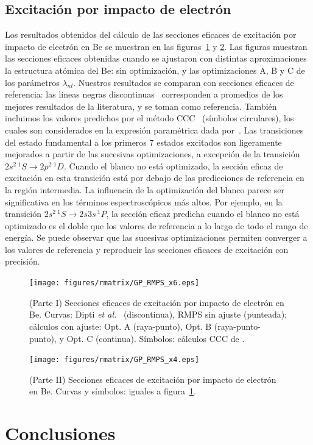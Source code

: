 \subsection{Excitación por impacto de electrón}

Los resultados obtenidos del cálculo de las secciones eficaces de 
excitación por impacto de electrón en Be se muestran en las 
figuras~\ref{fig:crossBe-partI} y \ref{fig:crossBe-partII}. Las figuras 
muestran las secciones eficaces obtenidas cuando se ajustaron con 
distintas aproximaciones la estructura atómica del Be: sin optimización, 
y las optimizaciones A, B y C de los parámetros $\lambda_{nl}$. Nuestros
resultados se comparan con secciones eficaces de referencia: las líneas
negras discontinuas~\cite{Dipti:19} corresponden a promedios de los 
mejores resultados de la literatura, y se toman como referencia. También
incluimos los valores predichos por el método CCC~\cite{Fursa:97} 
(símbolos circulares), los cuales son considerados en la expresión 
paramétrica dada por~\cite{Dipti:19}. Las transiciones del estado 
fundamental a los primeros 7 estados excitados son ligeramente mejorados 
a partir de las sucesivas optimizaciones, a excepción de la transición 
$2s^2\,^1S\rightarrow 2p^2\,^1D$. Cuando el blanco no está optimizado, 
la sección eficaz de excitación en esta transición está por debajo de 
las predicciones de referencia en la región intermedia. La influencia de 
la optimización del blanco parece ser significativa en los términos 
espectroscópicos más altos. Por ejemplo, en la transición 
$2s^2\,^1S\rightarrow 2s3s\,^1P$, la sección eficaz predicha cuando el 
blanco no está optimizado es el doble que los valores de referencia a lo 
largo de todo el rango de energía. Se puede observar que las sucesivas 
optimizaciones permiten converger a los valores de referencia y 
reproducir las secciones eficaces de excitación con precisión. 

\begin{figure}
\centering
\texttt{[image: figures/rmatrix/GP\_RMPS\_x6.eps]} 
\caption[Secciones eficaces de excitación de Be (Parte I).]
{(Parte I) Secciones eficaces de excitación por impacto de electrón en Be. 
Curvas: Dipti \textit{et al.}~\cite{Dipti:19} (discontinua), RMPS sin 
ajuste (punteada); cálculos con ajuste: Opt. A (raya-punto), Opt. B 
(raya-punto-punto), y Opt. C (continua). 
Símbolos: cálculos CCC de \cite{Fursa:97}.}
\label{fig:crossBe-partI}
\end{figure}

\begin{figure}
\centering
\texttt{[image: figures/rmatrix/GP\_RMPS\_x4.eps]} 
\caption[Secciones eficaces de excitación de Be (Parte II).]
{(Parte II) Secciones eficaces de excitación por impacto de electrón en Be.
Curvas y símbolos: iguales a figura~\ref{fig:crossBe-partI}.}
\label{fig:crossBe-partII}
\end{figure}

\newpage
\section{Conclusiones}
